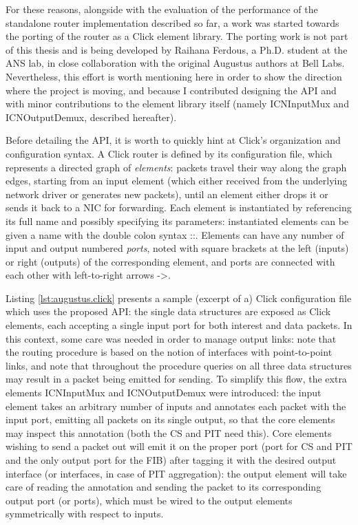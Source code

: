 \documentclass[11pt,a4paper,twoside,titlepage,openany]{book}
\newcommand{\mono}[1]{{\footnotesize \ttfamily #1}}
\begin{document}
For these reasons, alongside with the evaluation of the performance of the standalone router implementation described so far, a work was started towards the porting of the router as a Click element library. The porting work is not part of this thesis and is being developed by Raihana Ferdous, a Ph.D. student at the ANS lab, in close collaboration with the original Augustus authors at Bell Labs.
Nevertheless, this effort is worth mentioning here in order to show the direction where the project is moving, and because I contributed designing the API and with minor contributions to the element library itself (namely \mono{ICNInputMux} and \mono{ICNOutputDemux}, described hereafter).

Before detailing the API, it is worth to quickly hint at Click's organization and configuration syntax. A Click router is defined by its configuration file, which represents a directed graph of \emph{elements}: packets travel their way along the graph edges, starting from an input element (which either received from the underlying network driver or generates new packets), until an element either drops it or sends it back to a NIC for forwarding. Each element is instantiated by referencing its full name and possibly specifying its parameters: instantiated elements can be given a name with the double colon syntax \mono{::}. Elements can have any number of input and output numbered \emph{ports}, noted with square brackets at the left (inputs) or right (outputs) of the corresponding element, and ports are connected with each other with left-to-right arrows \mono{->}.

Listing \ref{lst:augustus.click} presents a sample (excerpt of a) Click configuration file which uses the proposed API: the single data structures are exposed as Click elements, each accepting a single input port for both interest and data packets. In this context, some care was needed in order to manage output links: note that the routing procedure is based on the notion of interfaces with point-to-point links, and note that throughout the procedure queries on all three data structures may result in a packet being emitted for sending. To simplify this flow, the extra elements \mono{ICNInputMux} and \mono{ICNOutputDemux} were introduced: the input element takes an arbitrary number of inputs and annotates each packet with the input port, emitting all packets on its single output, so that the core elements may inspect this annotation (both the CS and PIT need this). Core elements wishing to send a packet out will emit it on the proper port (port \mono{[1]} for CS and PIT and the only output port for the FIB) after tagging it with the desired output interface (or interfaces, in case of PIT aggregation): the output element will take care of reading the annotation and sending the packet to its corresponding output port (or ports), which must be wired to the output elements symmetrically with respect to inputs.
\end{document}
